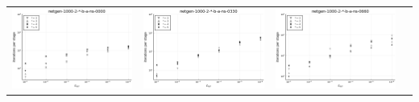 \documentclass{article}
\begin{document}
\begin{landscape}
\begin{center}
\begin{longtable}{| c | c | c | c |}
                \hline
\includegraphics[height=0.22\textheight]{itepst_fixlim_netgen-1000-2-_-b-a-ns-0000.png} &
\includegraphics[height=0.22\textheight]{itepst_fixlim_netgen-1000-2-_-b-a-ns-0330.png} &
\includegraphics[height=0.22\textheight]{itepst_fixlim_netgen-1000-2-_-b-a-ns-0660.png} &

\end{longtable}
\end{center}
\end{landscape}
\end{document}
